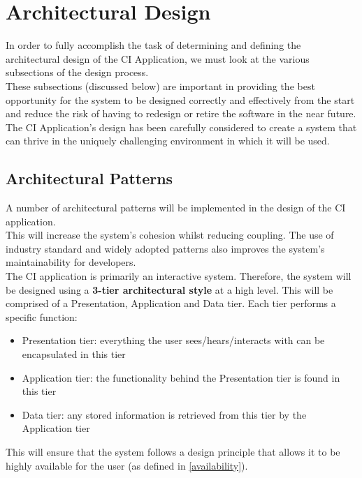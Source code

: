 \documentclass[11pt]{article}
\begin{document}
\section{Architectural Design}
In order to fully accomplish the task of determining and defining the architectural design of the CI Application, we must look at the various subsections of the design process.\\[0.5cm]
These subsections (discussed below) are important in providing the best opportunity for the system to be designed correctly and effectively from the start and reduce the risk of having to redesign or retire the software in the near future.\\[0.5cm]
The CI Application's design has been carefully considered to create a system that can thrive in the uniquely challenging environment in which it will be used.\\[0.5cm]

\subsection{Architectural Patterns}
A number of architectural patterns will be implemented in the design of the CI application.\\[0.5cm]
This will increase the system's cohesion whilst reducing coupling. The use of industry standard and widely adopted patterns also improves the system's maintainability for developers.\\[0.5cm]
The CI application is primarily an interactive system. Therefore, the system will be designed using a \textbf{3-tier architectural style} at a high level. This will be comprised of a Presentation, Application and Data tier. Each tier performs a specific function:
\begin{itemize}
    \item Presentation tier: everything the user sees/hears/interacts with can be encapsulated in this tier
    \item Application tier: the functionality behind the Presentation tier is found in this tier
    \item Data tier: any stored information is retrieved from this tier by the Application tier
\end{itemize}
This will ensure that the system follows a design principle that allows it to be highly available for the user (as defined in \ref{availability}).\\[0.5cm]
\end{document}

